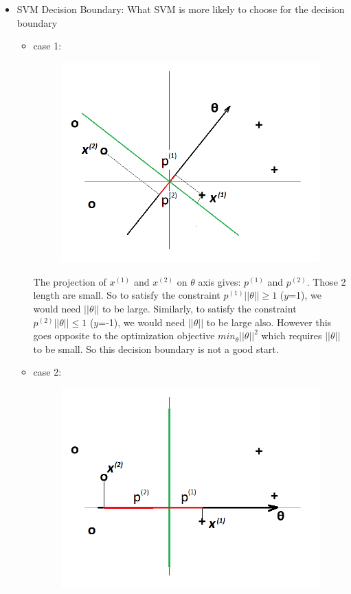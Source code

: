 \documentclass[a4paper,12pt]{report}
\begin{document}
\begin{itemize}
\item SVM Decision Boundary: What SVM is more likely to choose for the decision boundary
\begin{itemize}
\item case 1:
\begin{figure}[H]
	\centering
        \includegraphics[totalheight=4 cm]{case1decboundary.png}\caption{}
\end{figure}
The projection of $x^{(1)}$ and $x^{(2)}$ on $\theta$ axis gives: $p^{(1)}$ and $p^{(2)}$. Those 2 length are small. So to satisfy the constraint $p^{(1)} ||\theta|| \geq 1$ ($y$=1), we would need $||\theta||$ to be large. Similarly, to satisfy the constraint $p^{(2)} ||\theta|| \leq 1$ ($y$=-1), we would need $||\theta||$ to be large also. However this goes opposite to the optimization objective $min_{\theta} ||\theta||^2$ which requires $||\theta||$ to be small. So this decision boundary is not a good start. \\
\item case 2:
\begin{figure}[H]
	\centering
        \includegraphics[totalheight=4 cm]{case2decboundary.png}\caption{}

\end{figure}
\end{itemize}
\end{itemize}
\end{document}

